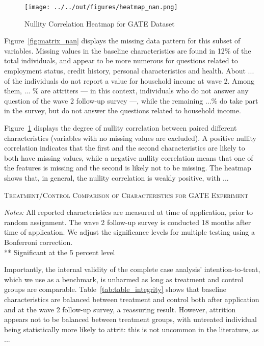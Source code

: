 \begin{figure}
    \caption{Nullity Correlation Heatmap for GATE Dataset}
    \texttt{[image: ../../out/figures/heatmap\_nan.png]}
    \label{fig:heatmap_nan}
\end{figure}


Figure~\ref{fig:matrix_nan} displays the missing data pattern for this subset of variables. Missing values in the baseline characteristics are found in 12\% of the total individuals, and appear to be more numerous for questions related to employment status, credit history, personal characteristics and health. About ... of the individuals do not report a value for household income at wave 2. Among them, ... \% are attriters --- in this context, individuals who do not answer any question of the wave 2 follow-up survey ---, while the remaining ...\% do take part in the survey, but do not answer the questions related to household income.

Figure~\ref{fig:heatmap_nan} displays the degree of nullity correlation between paired different characteristics (variables
with no missing values are excluded). A positive nullity correlation indicates that the first and the second characteristics are likely to both have missing values, while a negative nullity correlation means that one of the features is missing and the second is likely not to be missing. The heatmap shows that, in general, the nullity correlation is weakly positive, with ...

\begin{table}[t]
\centering
\caption{\textsc{Treatment/Control Comparison of Characteristics for GATE Experiment}}
\begin{adjustbox}{width=\textwidth, totalheight=\textheight, keepaspectratio}

\end{adjustbox}


\label{tab:table_integrity}
\medskip
\raggedright
\footnotesize
\textit{Notes:} All reported characteristics are measured at time of application, prior to random assignment. The wave 2 follow-up survey is conducted 18 months after time of application. We adjust the significance levels for multiple testing using a Bonferroni correction. \\
** Significant at the 5 percent level
\end{table}

Importantly, the internal validity of the complete case analysis' intention-to-treat, which we use as a benchmark, is unharmed as long as treatment and control groups are comparable. Table~\ref{tab:table_integrity} shows that baseline characteristics are balanced between treatment and control both after application and at the wave 2 follow-up survey, a reassuring result. However, attrition appears not to be balanced between treatment groups, with untreated individual being statistically more likely to attrit: this is not uncommon in the literature, as ... %

